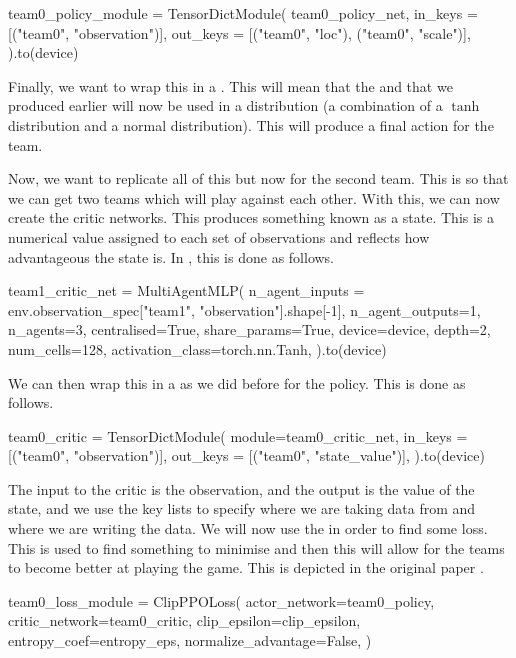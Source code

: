 \begin{mpy}
team0_policy_module = TensorDictModule(
    team0_policy_net,
    in_keys = [("team0", "observation")],
    out_keys = [("team0", "loc"), ("team0", "scale")],
).to(device)
\end{mpy}

Finally, we want to wrap this in a . This will mean that the  and  that we produced earlier will now be used in a  distribution (a combination of a $\tanh$ distribution and a normal distribution). This will produce a final action for the team.

\vs
Now, we want to replicate all of this but now for the second team. This is so that we can get two teams which will play against each other. With this, we can now create the critic networks. This produces something known as a state. This is a numerical value assigned to each set of observations and reflects how advantageous the state is. In , this is done as follows.

\vs
\begin{mpy}
team1_critic_net = MultiAgentMLP(
    n_agent_inputs = env.observation_spec["team1", "observation"].shape[-1],
    n_agent_outputs=1,
    n_agents=3,
    centralised=True,
    share_params=True,
    device=device,
    depth=2,
    num_cells=128,
    activation_class=torch.nn.Tanh,
).to(device)
\end{mpy}

We can then wrap this in a  as we did before for the policy. This is done as follows.

\begin{mpy}
team0_critic = TensorDictModule(
    module=team0_critic_net,
    in_keys = [("team0", "observation")],
    out_keys = [("team0", "state_value")],
).to(device)
\end{mpy}

The input to the critic is the observation, and the output is the value of the state, and we use the key lists to specify where we are taking data from and where we are writing the data. We will now use the  in order to find some loss. This is used to find something to minimise and then this will allow for the teams to become better at playing the game. This is depicted in the original paper \cite{ppo}.

\begin{mpy}
team0_loss_module = ClipPPOLoss(
    actor_network=team0_policy,
    critic_network=team0_critic,
    clip_epsilon=clip_epsilon,
    entropy_coef=entropy_eps,
    normalize_advantage=False,
)
\end{mpy}

